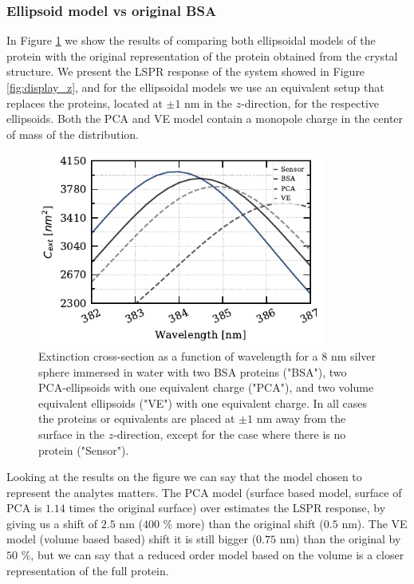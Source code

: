 \subsubsection{Ellipsoid model vs original BSA}\label{sssec:ell_mod_comp}

In Figure \ref{fig:2pz_ell_resp} we show the results of comparing both ellipsoidal models of the protein with the 
original representation of the protein obtained from the crystal structure. We present the LSPR response 
of the system showed in Figure \ref{fig:display_z}, and for the ellipsoidal models we use an equivalent 
setup that replaces the proteins, located at $\pm 1$ nm in the $z$-direction, for the respective ellipsoids.
Both the PCA and VE model contain a monopole charge in the center of mass of the distribution.

\begin{figure} %
    \centering
    \includegraphics[width=0.85\textwidth]{two_ell_analysis.pdf} 
    \caption{Extinction cross-section as a function of wavelength for a 8 nm silver sphere immersed 
    in water with two BSA proteins ("BSA"), two PCA-ellipsoids with one equivalent charge ("PCA"), and two
    volume equivalent ellipsoids ("VE") with one equivalent charge. In all cases the proteins or equivalents
    are placed at $\pm 1$ nm away from the surface in the $z$-direction, except for the case where there is 
    no protein ("Sensor").}
    \label{fig:2pz_ell_resp}
 \end{figure}

 Looking at the results on the figure we can say that the model chosen to represent the analytes matters. The PCA model (surface based model, 
 surface of PCA is $1.14$ times the original surface) over estimates the LSPR response, by giving us a shift of $2.5$ nm 
 ($400$ $\%$ more) than the original shift ($0.5$ nm). The VE model (volume based based) shift it is still bigger ($0.75$ nm) than the original 
 by $50$ $\%$, but we can say that a reduced order model based on the volume is a closer representation of the full protein. 
 

